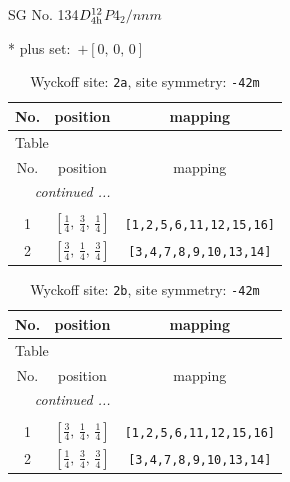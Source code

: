 \documentclass[fleqn,8pt]{jsarticle}
\begin{document}
\setcounter{MaxMatrixCols}{32}

\renewcommand{\tablename}{Table~}
\renewcommand{\figurename}{Figure~}
\begin{center}
\LARGE
SG No. 134\quad$D_{\rm 4h}^{12}$\quad$P4_2/nnm$\quad[ tetragonal ]
\end{center}
* plus set:\,\,\,$+\left[ 0,\, 0,\, 0 \right]$
\renewcommand{\arraystretch}{1.2}
\begin{longtable}{ccc}
\caption{Wyckoff site: {\tt 2a}, site symmetry: {\tt -42m}}
 \\
 \hline \hline
No. & position & mapping \\ \hline \endfirsthead

\multicolumn{2}{l}{\tablename\ \thetable{}} \\
 \hline \hline
No. & position & mapping \\ \hline \endhead

 \hline \hline
\multicolumn{2}{r}{\footnotesize\it continued ...} \\ \endfoot

 \hline \hline
\multicolumn{2}{r}{} \\ \endlastfoot

1 & $\left[ \frac{1}{4},\, \frac{3}{4},\, \frac{1}{4} \right]$ & {\tt [1,2,5,6,11,12,15,16]} \\ \hline
2 & $\left[ \frac{3}{4},\, \frac{1}{4},\, \frac{3}{4} \right]$ & {\tt [3,4,7,8,9,10,13,14]} \\
\end{longtable}
\renewcommand{\arraystretch}{1.2}
\begin{longtable}{ccc}
\caption{Wyckoff site: {\tt 2b}, site symmetry: {\tt -42m}}
 \\
 \hline \hline
No. & position & mapping \\ \hline \endfirsthead

\multicolumn{2}{l}{\tablename\ \thetable{}} \\
 \hline \hline
No. & position & mapping \\ \hline \endhead

 \hline \hline
\multicolumn{2}{r}{\footnotesize\it continued ...} \\ \endfoot

 \hline \hline
\multicolumn{2}{r}{} \\ \endlastfoot

1 & $\left[ \frac{3}{4},\, \frac{1}{4},\, \frac{1}{4} \right]$ & {\tt [1,2,5,6,11,12,15,16]} \\ \hline
2 & $\left[ \frac{1}{4},\, \frac{3}{4},\, \frac{3}{4} \right]$ & {\tt [3,4,7,8,9,10,13,14]} \\
\end{longtable}
\end{document}
